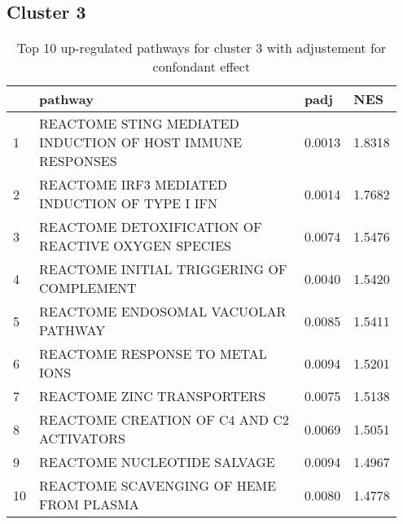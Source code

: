\documentclass{article}
\begin{document}
\subsection{Cluster 3 }
\begin{table}[H]
\centering
\begin{tabular}{p{0.05\linewidth}p{0.7\linewidth}p{0.1\linewidth}p{0.1\linewidth}}
  \hline
 & pathway & padj & NES \\ 
  \hline
1 & REACTOME STING MEDIATED INDUCTION OF HOST IMMUNE RESPONSES & 0.0013 & 1.8318 \\ 
  2 & REACTOME IRF3 MEDIATED INDUCTION OF TYPE I IFN & 0.0014 & 1.7682 \\ 
  3 & REACTOME DETOXIFICATION OF REACTIVE OXYGEN SPECIES & 0.0074 & 1.5476 \\ 
  4 & REACTOME INITIAL TRIGGERING OF COMPLEMENT & 0.0040 & 1.5420 \\ 
  5 & REACTOME ENDOSOMAL VACUOLAR PATHWAY & 0.0085 & 1.5411 \\ 
  6 & REACTOME RESPONSE TO METAL IONS & 0.0094 & 1.5201 \\ 
  7 & REACTOME ZINC TRANSPORTERS & 0.0075 & 1.5138 \\ 
  8 & REACTOME CREATION OF C4 AND C2 ACTIVATORS & 0.0069 & 1.5051 \\ 
  9 & REACTOME NUCLEOTIDE SALVAGE & 0.0094 & 1.4967 \\ 
  10 & REACTOME SCAVENGING OF HEME FROM PLASMA & 0.0080 & 1.4778 \\ 
   \hline
\end{tabular}
\caption{Top 10 up-regulated pathways for cluster 3 with adjustement for confondant effect} 
\label{tab:q3_2_conf_3}
\end{table}
\end{document}
